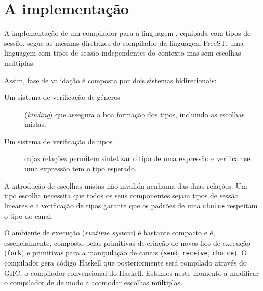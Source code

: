 \section{A implementação}

A implementação de um compilador para a linguagem \mixedchoice,
equipada com tipos de sessão, segue as mesmas diretrizes do compilador
da linguagem FreeST\cite{2019freest,2019freest-inforum}, uma linguagem
com tipos de sessão independentes do contexto mas sem escolhas
múltiplas.

Assim,  fase de validação é composta por dois sistemas bidirecionais:
\begin{description}
\item[Um sistema de verificação de géneros] (\textit{kinding}) que
  assegura  a boa formação dos tipos, incluindo as escolhas mistas.
\item[Um sistema de verificação de tipos] cujas relações permitem
  sintetizar o tipo de uma expressão e verificar se uma expressão tem
  o tipo esperado.
\end{description}
A introdução de escolhas mistas não invalida nenhuma das duas
relações.  Um tipo escolha necessita que todos os seus componentes
sejam tipos de sessão lineares e a verificação de tipos garante que os
padrões de uma \lstinline|choice| respeitam o tipo do canal.

O ambiente de execução (\textit{runtime system}) é bastante compacto e
é, essencialmente, composto pelas primitivas de criação de novos fios
de execução (\lstinline|fork|) e primitivas para a manipulação de
canais (\lstinline|send|, \lstinline|receive|, \lstinline|choice|). O
compilador gera código Haskell que posteriormente será compilado
através do GHC, o compilador convencional do Haskell.
%
Estamos neste momento a modificar o compilador de \freest{} de modo a
acomodar escolhas múltiplas.

